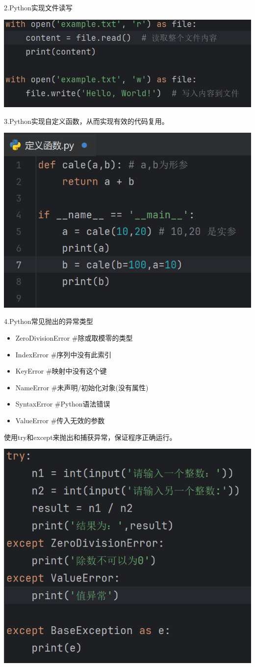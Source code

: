 \documentclass{article}
\begin{document}
2.Python实现文件读写\newline
\noindent
\begin{minipage}{\linewidth}
  \centering
  \includegraphics[width=0.5\linewidth]{Python文件读写.png}
  \label{fig:example}
\end{minipage}

3.Python实现自定义函数，从而实现有效的代码复用。

\noindent
\begin{minipage}{\linewidth}
  \centering
  \includegraphics[width=0.5\linewidth]{自定义函数.png}
  \label{fig:example}
\end{minipage}

4.Python常见抛出的异常类型

\begin{itemize}
\item ZeroDivisionError \#除或取模零的类型
\item  IndexError \#序列中没有此索引 
\item KeyError \#映射中没有这个键 
\item NameError \#未声明/初始化对象(没有属性) 
\item SyntaxError \#Python语法错误 
\item ValueError \#传入无效的参数 
\end{itemize}
\newline 使用try和except来抛出和捕获异常，保证程序正确运行。\newline
\noindent
\begin{minipage}{\linewidth}
 \centering
  \includegraphics[width=0.5\linewidth]{异常处理.png}
  \label{fig:example}
\end{minipage}
\end{document}

